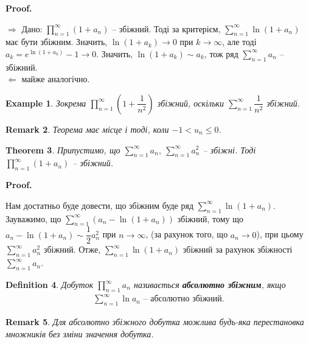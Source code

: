 \documentclass[a4paper, 10pt]{article}
\makeatletter
\def\qed{$\blacksquare$}
\def\rightproof{$\boxed{\Rightarrow}$ }
\def\leftproof{$\boxed{\Leftarrow}$ }
\theoremstyle{theoremdd}
\newtheorem{theorem}{Theorem}[subsection]
\theoremstyle{theoremdd}
\theoremstyle{theoremdd}
\newtheorem{definition}[theorem]{Definition}
\theoremstyle{theoremdd}
\theoremstyle{theoremdd}
\newtheorem{example}[theorem]{Example}
\theoremstyle{theoremdd}
\theoremstyle{theoremdd}
\newtheorem{remark}[theorem]{Remark}
\theoremstyle{theoremdd}
\theoremstyle{theoremdd}
\renewenvironment{proof}[1][Proof.\\]{\par
\pushQED{\hfill \qed}%
\normalfont \topsep6\p@\@plus6\p@\relax
\trivlist
\item\relax
{\bfseries
#1\@addpunct{.}}\hspace\labelsep\ignorespaces
}{%
\popQED\endtrivlist\@endpefalse
}
\makeatother
\begin{document}
\begin{proof}
\rightproof Дано: $\displaystyle\prod_{n=1}^\infty (1+a_n)$ -- збіжний. Тоді за критерієм, $\displaystyle\sum_{n=1}^\infty \ln(1+a_n)$ має бути збіжним. Значить, $\ln(1+a_k) \to 0$ при $k \to \infty$, але тоді $a_k = e^{\ln(1+a_k)} - 1 \to 0$. Значить, $\ln(1+a_k) \sim a_k$, тож ряд $\displaystyle\sum_{n=1}^\infty a_n$ -- збіжний.
\bigskip \\
\leftproof майже аналогічно.
\end{proof}

\begin{example}
Зокрема $\displaystyle\prod_{n=1}^\infty \left( 1 + \dfrac{1}{n^2} \right)$ збіжний, оскільки $\displaystyle\sum_{n=1}^\infty \dfrac{1}{n^2}$ збіжний.
\end{example}

\begin{remark}
Теорема має місце і тоді, коли $-1 < u_n \leq 0$.
\end{remark}

\begin{theorem}
Припустимо, що $\displaystyle\sum_{n=1}^\infty a_n,\ \sum_{n=1}^\infty a_n^2$ -- збіжні. Тоді $\displaystyle\prod_{n=1}^\infty (1+a_n)$ -- збіжний.
\end{theorem}

\begin{proof}
Нам достатньо буде довести, що збіжним буде ряд $\displaystyle\sum_{n=1}^\infty \ln(1+a_n)$.\\
Зауважимо, що $\displaystyle\sum_{n=1}^\infty (a_n - \ln(1+a_n))$ збіжний, тому що $a_n - \ln(1+a_n) \sim \dfrac{1}{2}a_n^2$ при $n \to \infty$, (за рахунок того, що $a_n \to 0$), при цьому $\displaystyle\sum_{n=1}^\infty a_n^2$ збіжний. Отже, $\displaystyle\sum_{n=1}^\infty \ln(1+a_n)$ збіжний за рахунок збіжності $\displaystyle\sum_{n=1}^\infty a_n$.
\end{proof}

\begin{definition}
Добуток $\displaystyle\prod_{n=1}^\infty a_n$ називається \textbf{абсолютно збіжним}, якщо
\begin{align*}
\sum_{n=1}^\infty \ln a_n \text{ -- абсолютно збіжний.}
\end{align*}
\end{definition}

\begin{remark}
Для абсолютно збіжного добутка можлива будь-яка перестановка множників без зміни значення добутка.
\end{remark}
\newpage
\end{document}
